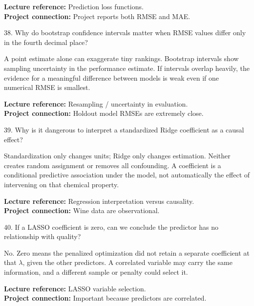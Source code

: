 \documentclass[10.5pt,a4paper]{article}
\newcommand{\chapref}[1]{\textbf{Lecture reference:} #1}
\newcommand{\projectref}[1]{\textbf{Project connection:} #1}
\begin{document}
\begin{refbox}\chapref{Prediction loss functions.}\\\projectref{Project reports both RMSE and MAE.}\end{refbox}
\begin{qbox}{38. Why do bootstrap confidence intervals matter when RMSE values differ only in the fourth decimal place?}
\end{qbox}
\begin{answerbox}A point estimate alone can exaggerate tiny rankings. Bootstrap intervals show sampling uncertainty in the performance estimate. If intervals overlap heavily, the evidence for a meaningful difference between models is weak even if one numerical RMSE is smallest.\end{answerbox}
\begin{refbox}\chapref{Resampling / uncertainty in evaluation.}\\\projectref{Holdout model RMSEs are extremely close.}\end{refbox}
\begin{qbox}{39. Why is it dangerous to interpret a standardized Ridge coefficient as a causal effect?}
\end{qbox}
\begin{answerbox}Standardization only changes units; Ridge only changes estimation. Neither creates random assignment or removes all confounding. A coefficient is a conditional predictive association under the model, not automatically the effect of intervening on that chemical property.\end{answerbox}
\begin{refbox}\chapref{Regression interpretation versus causality.}\\\projectref{Wine data are observational.}\end{refbox}
\begin{qbox}{40. If a LASSO coefficient is zero, can we conclude the predictor has no relationship with quality?}
\end{qbox}
\begin{answerbox}No. Zero means the penalized optimization did not retain a separate coefficient at that \(\lambda\), given the other predictors. A correlated variable may carry the same information, and a different sample or penalty could select it.\end{answerbox}
\begin{refbox}\chapref{LASSO variable selection.}\\\projectref{Important because predictors are correlated.}\end{refbox}
\end{document}
